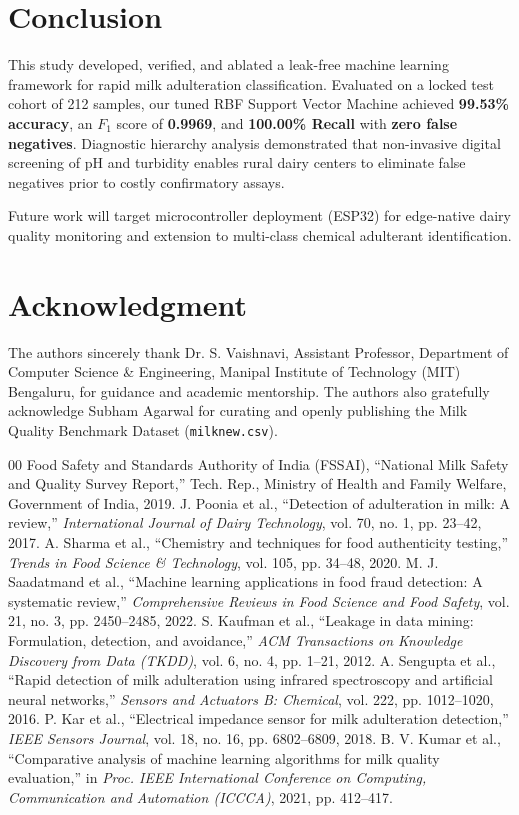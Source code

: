 \documentclass[conference]{IEEEtran}
\begin{document}
\section{Conclusion}
This study developed, verified, and ablated a leak-free machine learning framework for rapid milk adulteration classification. Evaluated on a locked test cohort of 212 samples, our tuned RBF Support Vector Machine achieved \textbf{99.53\% accuracy}, an $F_1$ score of \textbf{0.9969}, and \textbf{100.00\% Recall} with \textbf{zero false negatives}. Diagnostic hierarchy analysis demonstrated that non-invasive digital screening of pH and turbidity enables rural dairy centers to eliminate false negatives prior to costly confirmatory assays.

Future work will target microcontroller deployment (ESP32) for edge-native dairy quality monitoring and extension to multi-class chemical adulterant identification.

\section*{Acknowledgment}
The authors sincerely thank Dr. S. Vaishnavi, Assistant Professor, Department of Computer Science \& Engineering, Manipal Institute of Technology (MIT) Bengaluru, for guidance and academic mentorship. The authors also gratefully acknowledge Subham Agarwal for curating and openly publishing the Milk Quality Benchmark Dataset (\texttt{milknew.csv}).

\begin{thebibliography}{00}
 Food Safety and Standards Authority of India (FSSAI), ``National Milk Safety and Quality Survey Report,'' Tech. Rep., Ministry of Health and Family Welfare, Government of India, 2019.
 J. Poonia et al., ``Detection of adulteration in milk: A review,'' \textit{International Journal of Dairy Technology}, vol. 70, no. 1, pp. 23--42, 2017.
 A. Sharma et al., ``Chemistry and techniques for food authenticity testing,'' \textit{Trends in Food Science \& Technology}, vol. 105, pp. 34--48, 2020.
 M. J. Saadatmand et al., ``Machine learning applications in food fraud detection: A systematic review,'' \textit{Comprehensive Reviews in Food Science and Food Safety}, vol. 21, no. 3, pp. 2450--2485, 2022.
 S. Kaufman et al., ``Leakage in data mining: Formulation, detection, and avoidance,'' \textit{ACM Transactions on Knowledge Discovery from Data (TKDD)}, vol. 6, no. 4, pp. 1--21, 2012.
 A. Sengupta et al., ``Rapid detection of milk adulteration using infrared spectroscopy and artificial neural networks,'' \textit{Sensors and Actuators B: Chemical}, vol. 222, pp. 1012--1020, 2016.
 P. Kar et al., ``Electrical impedance sensor for milk adulteration detection,'' \textit{IEEE Sensors Journal}, vol. 18, no. 16, pp. 6802--6809, 2018.
 B. V. Kumar et al., ``Comparative analysis of machine learning algorithms for milk quality evaluation,'' in \textit{Proc. IEEE International Conference on Computing, Communication and Automation (ICCCA)}, 2021, pp. 412--417.
\end{thebibliography}
\end{document}
